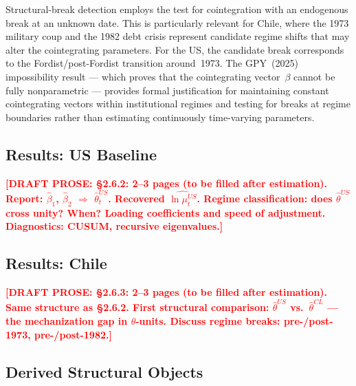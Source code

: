 \documentclass[12pt,letterpaper]{article}
\newcommand{\mut}{\mu_t}           %
\newcommand{\draftnote}[1]{%
  \textcolor{red}{\textbf{[DRAFT PROSE: #1]}}}
\begin{document}
Structural-break detection employs the \citet{gregoryhansen1996} test for
cointegration with an endogenous break at an unknown date. This is particularly
relevant for Chile, where the 1973 military coup and the 1982 debt crisis
represent candidate regime shifts that may alter the cointegrating parameters.
For the US, the candidate break corresponds to the Fordist/post-Fordist
transition around~1973. The GPY~(2025) impossibility result --- which proves
that the cointegrating vector~$\beta$ cannot be fully nonparametric ---
provides formal justification for maintaining constant cointegrating vectors
within institutional regimes and testing for breaks at regime boundaries rather
than estimating continuously time-varying parameters.


\subsection{Results: US Baseline}
\label{sec:stageA_us}

\draftnote{§2.6.2: 2--3 pages (to be filled after estimation).
  Report: $\hat{\beta}_1$, $\hat{\beta}_2$ $\Rightarrow$ $\hat{\theta}_t^{US}$.
  Recovered $\widehat{\ln\mut^{US}}$. Regime classification: does $\hat{\theta}^{US}$
  cross unity? When? Loading coefficients and speed of adjustment.
  Diagnostics: CUSUM, recursive eigenvalues.}


\subsection{Results: Chile}
\label{sec:stageA_chile}

\draftnote{§2.6.3: 2--3 pages (to be filled after estimation).
  Same structure as §2.6.2. First structural comparison:
  $\hat{\theta}^{US}$ vs.\ $\hat{\theta}^{CL}$ — the mechanization gap in
  $\theta$-units. Discuss regime breaks: pre-/post-1973, pre-/post-1982.}


\subsection{Derived Structural Objects}
\label{sec:stageA_derived}
\end{document}
